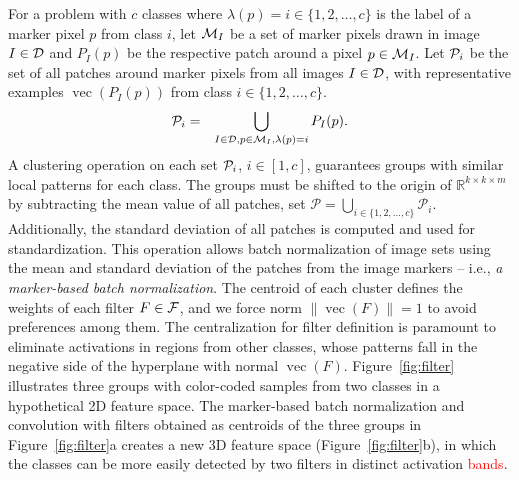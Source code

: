 \documentclass[journal, twoside]{IEEEtran}
\DeclareMathOperator{\vect}{vec}
\newcommand{\R}{\mathbb{R}}
\begin{document}
For a problem with $c$ classes where $\lambda(p)=i\in \{1,2,\ldots,c\}$ is the label of a marker pixel $p$ from class $i$, let ${\cal M}_I$ be a set of marker pixels drawn in image $I\in {\cal D}$ and $P_I(p)$ be the respective patch around a pixel $p\in {\cal M}_I$. Let ${\cal P}_i$ be the set of all patches around marker pixels from all images $I\in {\cal D}$, with representative examples  $\vect(P_I(p))$ from class $i\in \{1,2,\ldots,c\}$. 
\begin{eqnarray}
{\cal P}_i & = & \bigcup_{I\in {\cal D},p\in {\cal M}_I, \lambda(p) = i}{P_I(p)}.
\label{eq:pset}
\end{eqnarray}
A clustering operation on each set ${\cal P}_i$, $i\in [1,c]$, guarantees groups with similar local patterns for each class. The groups must be shifted to the origin of $\R^{k\times k\times m}$ by subtracting the mean value of all patches, set $\mathcal{P} = \bigcup_{i \in \{1, 2, \ldots, c\}}{\mathcal{P}_i}$. Additionally, the standard deviation of all patches is computed and used for standardization. This operation allows batch normalization of image sets using the mean and standard deviation of the patches from the image markers -- i.e.,  \emph{a marker-based batch normalization}. The centroid of each cluster defines the weights of each filter $F\in {\cal F}$, and we force norm $\|\vect(F)\|=1$ to avoid preferences among them. The centralization for filter definition is paramount to eliminate activations in regions from other classes, whose patterns fall in the negative side of the hyperplane with normal $\vect(F)$. Figure~\ref{fig:filter} illustrates three groups with color-coded samples from two classes in a hypothetical 2D feature space. The marker-based batch normalization and convolution with filters obtained as centroids of the three groups in Figure~\ref{fig:filter}a creates a new 3D feature space (Figure~\ref{fig:filter}b), in which the classes can be more easily detected by two filters in distinct activation \textcolor{red}{bands}.
\end{document}

